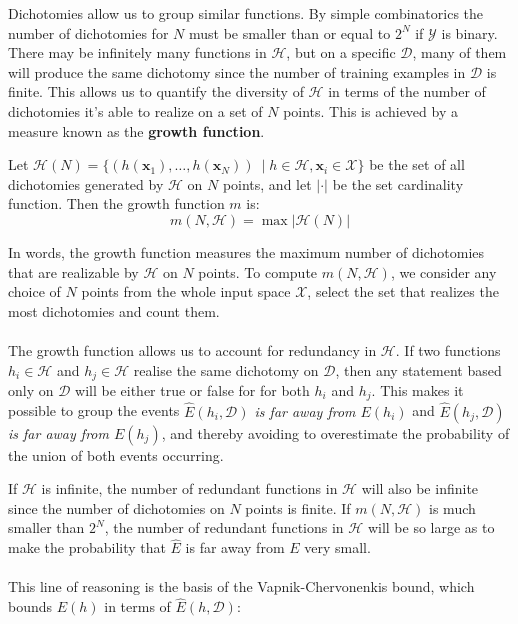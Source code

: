 Dichotomies allow us to group similar functions. By simple combinatorics the number of dichotomies for $N$ must be smaller than or equal to $2^N$ if $\mathcal{Y}$ is binary. There may be infinitely many functions in $\mathcal{H}$, but on a specific $\mathcal{D}$, many of them will produce the same dichotomy since the number of training examples in $\mathcal{D}$ is finite.
This allows us to quantify the diversity of $\mathcal{H}$ in terms of the number of dichotomies it's able to realize on a set of $N$ points. This is achieved by a measure known as the \textbf{growth function}.
\begin{definition}
	\label{growth_function}
	Let $\mathcal{H}(N) = \{(h(\mathbf{x}_1), \dots, h(\mathbf{x}_N))\ \mid h \in \mathcal{H}, \mathbf{x}_i \in \mathcal{X}\}$ be the set of all dichotomies generated by $\mathcal{H}$ on $N$ points, and let $|\cdot|$ be the set cardinality function. Then the growth function $m$ is:
	$$
		m(N, \mathcal{H}) = \max |\mathcal{H}(N)|
	$$
\end{definition}
In words, the growth function measures the maximum number of dichotomies that are realizable by $\mathcal{H}$ on $N$ points. To compute $m(N, \mathcal{H})$, we consider any choice of $N$ points from the whole input space $\mathcal{X}$, select the set that realizes the most dichotomies and count them.
\\\\
The growth function allows us to account for redundancy in $\mathcal{H}$. If two functions $h_i \in \mathcal{H}$ and $h_j \in \mathcal{H}$ realise the same dichotomy on $\mathcal{D}$, then any statement based only on $\mathcal{D}$ will be either true or false for for both $h_i$ and $h_j$. This makes it possible to group the events \textit{$\hat{E}(h_i, \mathcal{D})$ is far away from $E(h_i)$} and \textit{$\hat{E}(h_j, \mathcal{D})$ is far away from $E(h_j)$}, and thereby avoiding to overestimate the probability of the union of both events occurring.

If $\mathcal{H}$ is infinite, the number of redundant functions in $\mathcal{H}$ will also be infinite since the number of dichotomies on $N$ points is finite. If $m(N, \mathcal{H})$ is much smaller than $2^N$, the number of redundant functions in $\mathcal{H}$ will be so large as to make the probability that $\hat{E}$ is far away from $E$ very small.
\\\\
 This line of reasoning is the basis of the Vapnik-Chervonenkis bound, which bounds $E(h)$ in terms of $\hat{E}(h, \mathcal{D})$:

